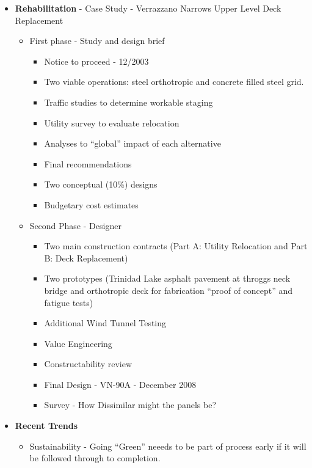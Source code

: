 \documentclass{article}
\begin{document}
\begin{itemize}
\begin{itemize}
\begin{itemize}
            \end{itemize}
        \item \textbf{Rehabilitation} - Case Study - Verrazzano Narrows Upper Level Deck Replacement
        \begin{itemize}
            \item First phase - Study and design brief
            \begin{itemize}
                \item Notice to proceed - 12/2003
                \item Two viable operations: steel orthotropic and concrete filled steel grid.
                \item Traffic studies to determine workable staging
                \item Utility survey to evaluate relocation
                \item Analyses to ``global'' impact of each alternative
                \item Final recommendations
                \item Two conceptual (10\%) designs
                \item Budgetary cost estimates
            \end{itemize}
            \item Second Phase - Designer
            \begin{itemize}
                \item Two main construction contracts (Part A: Utility Relocation and Part B: Deck Replacement)
                \item Two prototypes (Trinidad Lake asphalt pavement at throggs neck bridge and orthotropic deck for fabrication ``proof of concept'' and fatigue tests)
                \item Additional Wind Tunnel Testing
                \item Value Engineering
                \item Constructability review
                \item Final Design - VN-90A - December 2008
                \item Survey - How Dissimilar might the panels be?
            \end{itemize}
        \end{itemize}
        \item \textbf{Recent Trends}
        \begin{itemize}
            \item Sustainability - Going ``Green'' neeeds to be part of process early if it will be followed through to completion.

\end{itemize}
\end{itemize}
\end{itemize}
\end{document}
